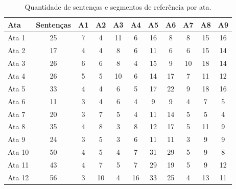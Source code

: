 \begin{table}[!h]
	\centering
	\begin{tabular}{|l|c|c|c|c|c|c|c|c|c|c|} \hline
		\textbf{Ata} & \textbf{Sentenças}  & 
		\textbf{A1}  & 
		\textbf{A2}  & 
		\textbf{A3}  & 
		\textbf{A4}  & 
		\textbf{A5}  & 
		\textbf{A6}  & 
		\textbf{A7}  & 
		\textbf{A8}  & 
		\textbf{A9} \\	\hline

		Ata 1  & 25 & 7  & 4  & 11 & 6  & 16 & 8  & 8  & 15 & 16 \\ \hline 
		Ata 2  & 17 & 4  & 4  & 8  & 6  & 11 & 6  & 6  & 15 & 14 \\ \hline 
		Ata 3  & 26 & 6  & 6  & 8  & 4  & 15 & 9  & 10 & 18 & 14 \\ \hline 
		Ata 4  & 26 & 5  & 5  & 10 & 6  & 14 & 17 & 7  & 11 & 12 \\ \hline 
		Ata 5  & 33 & 4  & 4  & 6  & 5  & 17 & 22 & 9  & 18 & 16 \\ \hline 
		Ata 6  & 11 & 3  & 4  & 6  & 4  & 9  & 9  & 4  & 7  &  5 \\ \hline 
		Ata 7  & 20 & 3  & 7  & 5  & 4  & 11 & 14 & 5  & 5  &  4 \\ \hline 
		Ata 8  & 35 & 4  & 8  & 3  & 8  & 12 & 17 & 5  & 11 &  9 \\ \hline 
		Ata 9  & 24 & 3  & 5  & 3  & 6  & 11 & 11 & 3  & 9  &  9 \\ \hline 
		Ata 10 & 50 & 4  & 5  & 4  & 7  & 31 & 29 & 5  & 9  &  8 \\ \hline 
		Ata 11 & 43 & 4  & 7  & 5  & 7  & 29 & 19 & 5  & 9  & 12 \\ \hline 
		Ata 12 & 56 & 3  & 10 & 4  & 16 & 33 & 25 & 4  & 13 & 11 \\ \hline 

	\end{tabular}
	\caption{Quantidade de sentenças e segmentos de referência por ata.}
	\label{tab:segmentacaoreferencia}
\end{table}












